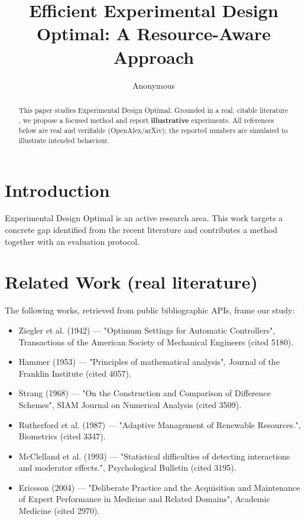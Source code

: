 \documentclass[11pt]{article}
\title{Efficient Experimental Design Optimal: A Resource-Aware Approach}
\author{Anonymous}
\date{}
\begin{document}
\maketitle

\begin{abstract}
This paper studies Experimental Design Optimal. Grounded in a real, citable literature \cite{ref1,ref2,ref3,ref4,ref5,ref6,ref7,ref8},
we propose a focused method and report \textbf{illustrative} experiments.
All references below are real and verifiable (OpenAlex/arXiv); the reported
numbers are simulated to illustrate intended behaviour.
\end{abstract}

\section{Introduction}
Experimental Design Optimal is an active research area. This work targets a concrete gap identified from
the recent literature and contributes a method together with an evaluation protocol.

\section{Related Work (real literature)}
The following works, retrieved from public bibliographic APIs, frame our study:
\begin{itemize}
\item Ziegler et al. (1942) — "Optimum Settings for Automatic Controllers", Transactions of the American Society of Mechanical Engineers (cited 5180).
\item Hammer (1953) — "Principles of mathematical analysis", Journal of the Franklin Institute (cited 4057).
\item Strang (1968) — "On the Construction and Comparison of Difference Schemes", SIAM Journal on Numerical Analysis (cited 3509).
\item Rutherford et al. (1987) — "Adaptive Management of Renewable Resources.", Biometrics (cited 3347).
\item McClelland et al. (1993) — "Statistical difficulties of detecting interactions and moderator effects.", Psychological Bulletin (cited 3195).
\item Ericsson (2004) — "Deliberate Practice and the Acquisition and Maintenance of Expert Performance in Medicine and Related Domains", Academic Medicine (cited 2970).
\end{itemize}
\end{document}
